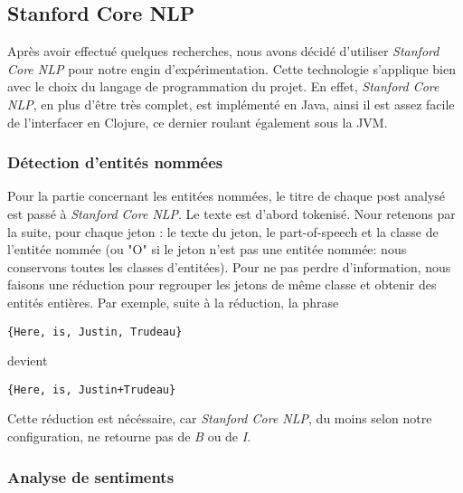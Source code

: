 \documentclass[12pt]{article}
\begin{document}
\subsection{Stanford Core NLP}

Après avoir effectué quelques recherches, nous avons décidé d'utiliser \textit{Stanford Core NLP} pour notre engin d'expérimentation. Cette technologie s'applique bien avec le choix du langage de programmation du projet. En effet, \textit{Stanford Core NLP}, en plus d'être très complet, est implémenté en Java, ainsi il est assez facile de l'interfacer en Clojure, ce dernier roulant également sous la JVM.

\subsubsection{Détection d'entités nommées}
\label{sec:named-entities}

Pour la partie concernant les entitées nommées, le titre de chaque post analysé est passé à \textit{Stanford Core NLP}. Le texte est d'abord tokenisé. Nour retenons par la suite, pour chaque jeton : le texte du jeton, le part-of-speech et la classe de l'entitée nommée (ou "O" si le jeton n'est pas une entitée nommée: nous conservons toutes les classes d'entitées). Pour ne pas perdre d'information, nous faisons une réduction pour regrouper les jetons de même classe et obtenir des entités entières. Par exemple, suite à la réduction, la phrase

\begin{verbatim}
{Here, is, Justin, Trudeau}
\end{verbatim}

devient

\begin{verbatim}
{Here, is, Justin+Trudeau}
\end{verbatim}

Cette réduction est nécéssaire, car \textit{Stanford Core NLP}, du moins selon notre configuration, ne retourne pas de \textit{B} ou de \textit{I}.

\subsubsection{Analyse de sentiments}
\end{document}
